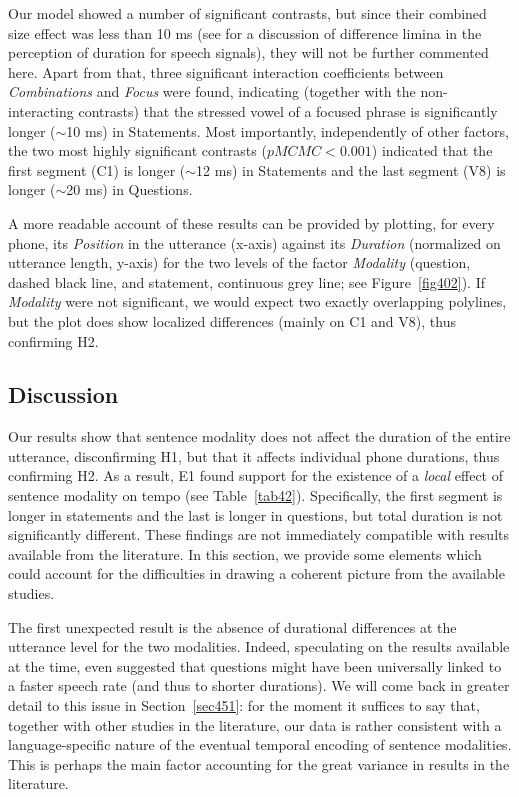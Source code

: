 Our model showed a number of significant contrasts, but since their combined size effect was less than 10 ms (see \citealt{lehiste1970suprasegmentals} for a discussion of difference limina in the perception of duration for speech signals), they will not be further commented here. Apart from that, three significant interaction coefficients between \textit{Combinations} and \textit{Focus} were found, indicating (together with the non-interacting contrasts) that the stressed vowel of a focused phrase is significantly longer ($ \sim $10 ms) in Statements. Most importantly, independently of other factors, the two most highly significant contrasts ($pMCMC<0.001$) indicated that the first segment (C1) is longer ($ \sim $12 ms) in Statements and the last segment (V8) is longer ($ \sim $20 ms) in Questions.

A more readable account of these results can be provided by plotting, for every phone, its \textit{Position} in the utterance (x-axis) against its \textit{Duration} (normalized on utterance length, y-axis) for the two levels of the factor \textit{Modality} (question, dashed black line, and statement, continuous grey line; see Figure~\ref{fig402}). If \textit{Modality} were not significant, we would expect two exactly overlapping polylines, but the plot does show localized differences (mainly on C1 and V8), thus confirming H2.

\subsection{Discussion}\label{sec434}
Our results show that sentence modality does not affect the duration of the entire utterance, disconfirming H1, but that it affects individual phone durations, thus confirming H2. As a result, E1 found support for the existence of a \textit{local} effect of sentence modality on tempo (see Table~\ref{tab42}). Specifically, the first segment is longer in statements and the last is longer in questions, but total duration is not significantly different. These findings are not immediately compatible with results available from the literature. In this section, we provide some elements which could account for the difficulties in drawing a coherent picture from the available studies. 

The first unexpected result is the absence of durational differences at the utterance level for the two modalities. Indeed, speculating on the results available at the time, \citet{vanheuven2005speech} even suggested that questions might have been universally linked to a faster speech rate (and thus to shorter durations). We will come back in greater detail to this issue in Section~\ref{sec451}: for the moment it suffices to say that, together with other studies in the literature, our data is rather consistent with a language-specific nature of the eventual temporal encoding of sentence modalities. This is perhaps the main factor accounting for the great variance in results in the literature.

